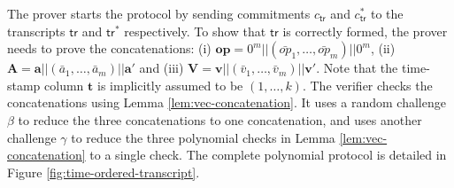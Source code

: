 \documentclass[sigconf]{acmart}
\renewcommand{\vec}{\mathbf} %
\newcommand{\op}{{op}} %
\newcommand{\tr}{\ensuremath{\mathsf{tr}}}
\begin{document}
	The prover starts the protocol by sending commitments $c_\tr$ and $c^\ast_\tr$ to the transcripts $\tr$ and $\tr^\ast$ respectively.
	To show that $\tr$ is correctly formed, the prover needs to prove the concatenations:
	(i) $\vec{\op}=0^m||(\bar{\op}_1,\ldots,\bar{\op}_m)||0^m$, (ii) $\vec{A}=\vec{a}||(\bar{a}_1,\ldots,\bar{a}_m)||\vec{a'}$
	and (iii) $\vec{V}=\vec{v}||(\bar{v}_1,\ldots,\bar{v}_m)||\vec{v'}$. Note that the time-stamp column $\vec{t}$ is implicitly assumed
	to be $(1,\ldots,k)$.
	The verifier checks the concatenations using Lemma \ref{lem:vec-concatenation}.
	It uses a random challenge $\beta$ to reduce the three concatenations to one concatenation, and uses another challenge $\gamma$
	to reduce the three polynomial checks in Lemma \ref{lem:vec-concatenation} to a single check.
	The complete polynomial protocol is detailed in Figure \ref{fig:time-ordered-transcript}.
	
	
	
%	
	
\end{document}
